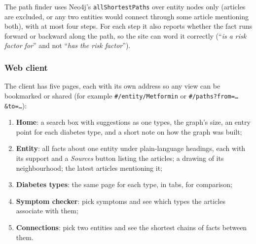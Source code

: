\documentclass[11pt, a4paper]{article}
\newcommand{\code}[1]{\texttt{#1}}
\begin{document}
The path finder uses Neo4j's \code{allShortestPaths} over entity nodes only (articles are excluded, or any two entities would connect through some article mentioning both), with at most four steps. For each step it also reports whether the fact runs forward or backward along the path, so the site can word it correctly (``\emph{is a risk factor for}'' and not ``\emph{has the risk factor}'').

\subsubsection{Web client}

The client has five pages, each with its own address so any view can be bookmarked or shared (for example \code{\#/entity/Metformin} or \code{\#/paths?from=\ldots\&to=\ldots}):
\begin{enumerate}
    \item \textbf{Home}: a search box with suggestions as one types, the graph's size, an entry point for each diabetes type, and a short note on how the graph was built;
    \item \textbf{Entity}: all facts about one entity under plain-language headings, each with its support and a \emph{Sources} button listing the articles; a drawing of its neighbourhood; the latest articles mentioning it;
    \item \textbf{Diabetes types}: the same page for each type, in tabs, for comparison;
    \item \textbf{Symptom checker}: pick symptoms and see which types the articles associate with them;
    \item \textbf{Connections}: pick two entities and see the shortest chains of facts between them.
\end{enumerate}
\end{document}
